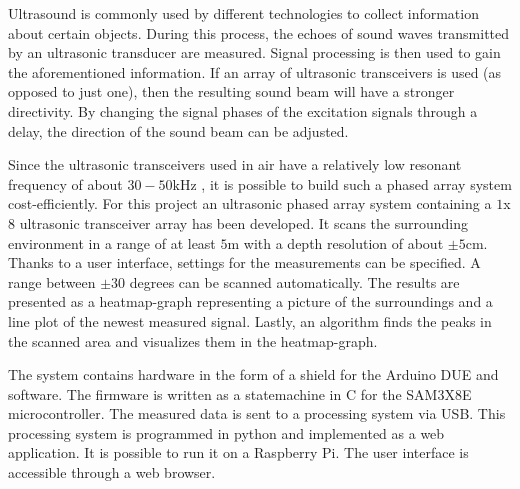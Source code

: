 Ultrasound is commonly used by different technologies to collect information about certain objects. During this process, the echoes of sound waves transmitted by an ultrasonic transducer are measured. Signal processing is then used to gain the aforementioned information.
If an array of ultrasonic transceivers is used (as opposed to just one), then the resulting sound beam will have a stronger directivity. By changing the signal phases of the excitation signals through a delay, the direction of the sound beam can be adjusted.

Since the ultrasonic transceivers used in air have a relatively low resonant frequency of about $30 - 50 \mathrm{kHz}$ , it is possible to build such a phased array system cost-efficiently. For this project an ultrasonic phased array system containing a $1$x$8$ ultrasonic transceiver array has been developed. It scans the surrounding environment in a range of at least $5 \mathrm{m}$ with a depth resolution of about $\pm 5 \mathrm{cm}$. Thanks to a user interface, settings for the measurements can be specified. A range between $\pm 30$ degrees can be scanned automatically. The results are presented as a heatmap-graph representing a picture of the surroundings and a line plot of the newest measured signal. Lastly, an algorithm finds the peaks in the scanned area and visualizes them in the heatmap-graph.

The system contains hardware in the form of a shield for the Arduino DUE and software. The firmware is written as a statemachine in C for the SAM3X8E microcontroller. The measured data is sent to a processing system via USB. This processing system is programmed in python and implemented as a web application. It is possible to run it on a Raspberry Pi. The user interface is accessible through a web browser.
